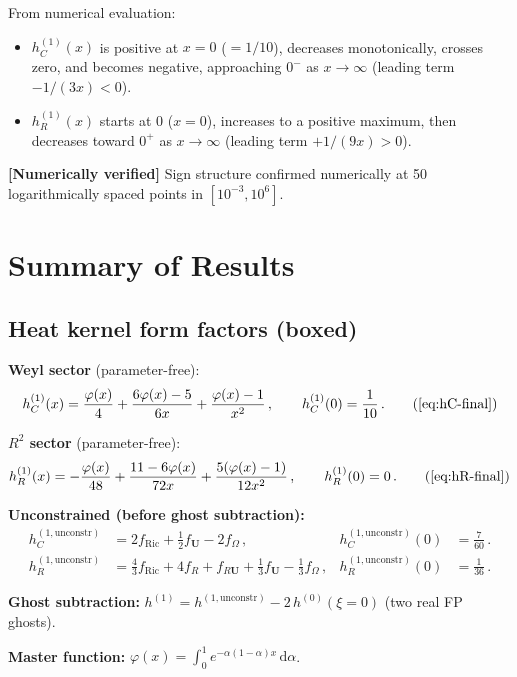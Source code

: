 \documentclass[11pt,a4paper]{article}
\newcommand{\dd}{\mathrm{d}}
\theoremstyle{definition}
\theoremstyle{remark}
\newcommand{\verified}[1]{%
  \par\noindent\colorbox{green!10}{%
    \parbox{\dimexpr\linewidth-2\fboxsep}{%
      \textcolor{green!50!black}{\textbf{[Numerically verified]}}
      \textcolor{green!50!black}{#1}%
    }%
  }\par%
}
\begin{document}
From numerical evaluation:
\begin{itemize}[nosep]
\item $h_C^{(1)}(x)$ is positive at $x = 0$ ($= 1/10$),
  decreases monotonically, crosses zero, and becomes negative,
  approaching $0^-$ as $x \to \infty$ (leading term $-1/(3x) < 0$).
\item $h_R^{(1)}(x)$ starts at $0$ ($x = 0$), increases to a
  positive maximum, then decreases toward $0^+$ as $x \to \infty$
  (leading term $+1/(9x) > 0$).
\end{itemize}

\verified{Sign structure confirmed numerically at 50 logarithmically
spaced points in $[10^{-3}, 10^6]$.}


\section{Summary of Results}
\label{sec:summary}

\subsection{Heat kernel form factors (boxed)}

\begin{tcolorbox}[colback=blue!5!white,colframe=blue!50!black,
  title={\textbf{Vector heat kernel form factors}}]
\textbf{Weyl sector} (parameter-free):
\begin{equation}
  h_C^{(1)}(x) = \frac{\varphi(x)}{4}
  + \frac{6\varphi(x) - 5}{6x}
  + \frac{\varphi(x) - 1}{x^2}\,,\qquad
  h_C^{(1)}(0) = \frac{1}{10}\,.
  \tag{\ref{eq:hC-final}}
\end{equation}

\textbf{$R^2$ sector} (parameter-free):
\begin{equation}
  h_R^{(1)}(x) = -\frac{\varphi(x)}{48}
  + \frac{11 - 6\varphi(x)}{72x}
  + \frac{5(\varphi(x)-1)}{12x^2}\,,\qquad
  h_R^{(1)}(0) = 0\,.
  \tag{\ref{eq:hR-final}}
\end{equation}

\textbf{Unconstrained (before ghost subtraction):}
\begin{align*}
  h_C^{(1,\mathrm{unconstr})} &= 2f_{\mathrm{Ric}}
  + \tfrac{1}{2}f_{\mathbf{U}} - 2f_\Omega\,,
  &h_C^{(1,\mathrm{unconstr})}(0) &= \frac{7}{60}\,.\\
  h_R^{(1,\mathrm{unconstr})} &= \tfrac{4}{3}f_{\mathrm{Ric}}
  + 4f_R + f_{R\mathbf{U}}
  + \tfrac{1}{3}f_{\mathbf{U}} - \tfrac{1}{3}f_\Omega\,,
  &h_R^{(1,\mathrm{unconstr})}(0) &= \frac{1}{36}\,.
\end{align*}

\textbf{Ghost subtraction:}
$h^{(1)} = h^{(1,\mathrm{unconstr})} - 2\,h^{(0)}(\xi=0)$
(two real FP ghosts).

\textbf{Master function:}
$\displaystyle\varphi(x) = \int_0^1 e^{-\alpha(1-\alpha)x}\,\dd\alpha$.
\end{tcolorbox}
\end{document}

